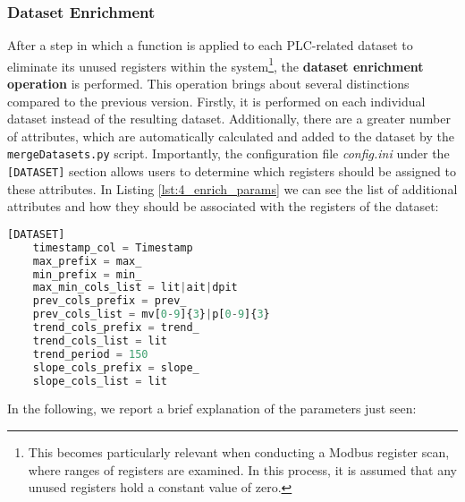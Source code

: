 \subsubsection{Dataset Enrichment}
\label{subsubsec:4_dataset_enrichment}
After a step in which a function is applied to each PLC-related dataset to eliminate its unused registers within the system\footnote{This becomes particularly relevant when conducting a Modbus register scan, where ranges of registers are examined. In this process, it is assumed that any unused registers hold a constant value of zero.}, the \textbf{dataset enrichment operation} is performed.\newline
This operation brings about several distinctions compared to the previous version. Firstly, it is performed on each individual dataset instead of the resulting dataset. Additionally, there are a greater number of attributes, which are automatically calculated and added to the dataset by the \texttt{mergeDatasets.py} script. Importantly, the configuration file \textit{config.ini} under the \texttt{[DATASET]} section allows users to determine which registers should be assigned to these attributes.\newline
In Listing \ref{lst:4_enrich_params} we can see the list of additional attributes and how they should be associated with the registers of the dataset:

\begin{lstlisting}[language=Python,numbers=none,caption={\texttt{config.ini} parameters for dataset enriching},label=lst:4_enrich_params]
	[DATASET]
	timestamp_col = Timestamp
	max_prefix = max_
	min_prefix = min_
	max_min_cols_list = lit|ait|dpit
	prev_cols_prefix = prev_
	prev_cols_list = mv[0-9]{3}|p[0-9]{3}
	trend_cols_prefix = trend_
	trend_cols_list = lit
	trend_period = 150
	slope_cols_prefix = slope_
	slope_cols_list = lit
\end{lstlisting}

\noindent In the following, we report a brief explanation of the parameters just seen:

